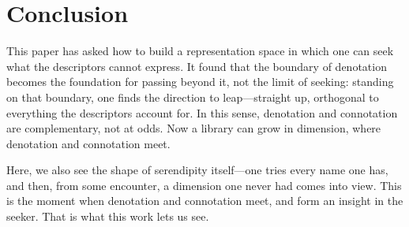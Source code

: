 \section{Conclusion}\label{sec:conclusion}

This paper has asked how to build a representation space in which one can
seek what the descriptors cannot express. It found that the boundary of
denotation becomes the foundation for passing beyond it, not the limit of
seeking: standing on that boundary, one finds the direction to
leap---straight up, orthogonal to everything the descriptors account for. In
this sense, denotation and connotation are complementary, not at odds. Now a
library can grow in dimension, where denotation and connotation meet.

Here, we also see the shape of serendipity itself---one tries every name one
has, and then, from some encounter, a dimension one never had comes into
view. This is the moment when denotation and connotation meet, and form an
insight in the seeker. That is what this work lets us see.

